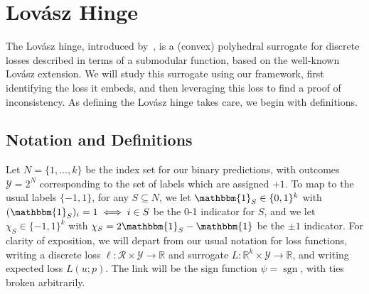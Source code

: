 \documentclass[11pt]{article}
\newcommand{\reals}{\mathbb{R}}
\newcommand{\R}{\mathcal{R}}
\newcommand{\Y}{\mathcal{Y}}
\newcommand{\trim}{\mathrm{trim}}
\newcommand{\ones}{\mathbbm{1}}
\DeclareMathOperator*{\sgn}{sgn}
\newtheorem{lemma}{Lemma}
\begin{document}



\section{Lov\'asz Hinge}\label{app:lovasz}

The Lov\'asz hinge, introduced by~\citet{yu2018lovasz}, is a (convex) polyhedral surrogate for discrete losses described in terms of a submodular function, based on the well-known Lov\'asz extension.
We will study this surrogate using our framework, first identifying the loss it embeds, and then leveraging this loss to find a proof of inconsistency.
As defining the Lov\'asz hinge takes care, we begin with definitions.

\subsection{Notation and Definitions}
Let $N = \{1,\ldots,k\}$ be the index set for our binary predictions, with outcomes $\Y = 2^N$ corresponding to the set of labels which are assigned $+1$.
To map to the usual labels $\{-1,1\}$, for any $S\subseteq N$, we let $\ones_S \in \{0,1\}^k$ with $(\ones_S)_i = 1 \iff i\in S$ be the 0-1 indicator for $S$, and we let $\chi_S \in \{-1,1\}^k$ with $\chi_S = 2\ones_S - \ones$ be the $\pm 1$ indicator.
For clarity of exposition, we will depart from our usual notation for loss functions, writing a discrete loss $\ell : \R \times \Y \to \reals$ and surrogate $L : \reals^k \times \Y \to \reals$, and writing expected loss $L(u;p)$.
The link will be the sign function $\psi = \sgn$, with ties broken arbitrarily.
\end{document}
